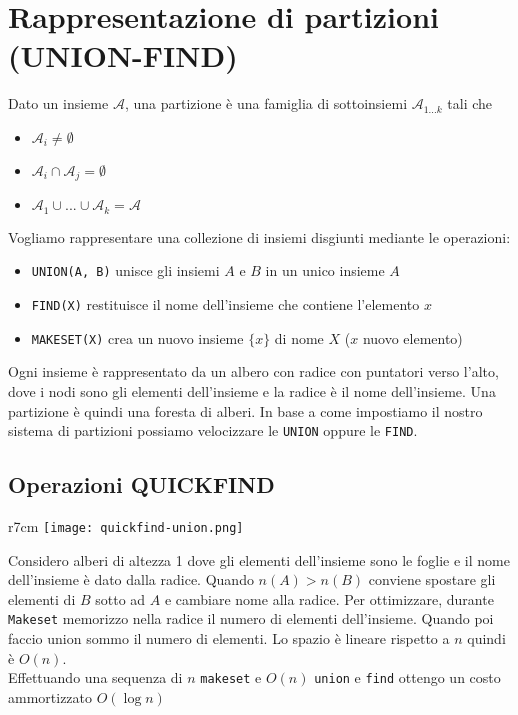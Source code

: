 \section[Union-Find]{Rappresentazione di partizioni (UNION-FIND)}
Dato un insieme $\mathcal{A}$, una partizione è una famiglia di sottoinsiemi $\mathcal{A}_{1...k}$ tali che 
\begin{itemize}
    \item $\mathcal{A}_{i} \neq \emptyset$
    \item  $\mathcal{A}_{i} \cap \mathcal{A}_{j} = \emptyset$
    \item $\mathcal{A}_{1} \cup ... \cup \mathcal{A}_{k} = \mathcal{A}$
\end{itemize}

Vogliamo rappresentare una collezione di insiemi disgiunti mediante le operazioni:
\begin{itemize}
    \item \texttt{UNION(A, B)} unisce gli insiemi $A$ e $B$ in un unico insieme $A$
    \item \texttt{FIND(X)} restituisce il nome dell'insieme che contiene l'elemento $x$
    \item \texttt{MAKESET(X)} crea un nuovo insieme $\lbrace x \rbrace$ di nome $X$ ($x$ nuovo elemento)
\end{itemize}

\noindent Ogni insieme è rappresentato da un albero con radice con puntatori verso l'alto, dove i nodi sono 
gli elementi dell'insieme e la radice è il nome dell'insieme. Una partizione è quindi una foresta di alberi.
In base a come impostiamo il nostro sistema di partizioni possiamo velocizzare le \texttt{UNION} 
oppure le \texttt{FIND}.

\subsection{Operazioni QUICKFIND}
\begin{wrapfigure}{r}{7cm}
    \texttt{[image: quickfind-union.png]}
\end{wrapfigure}
Considero alberi di altezza 1 dove gli elementi dell'insieme sono le foglie
e il nome dell'insieme è dato dalla radice.
Quando $n(A) > n(B)$ conviene spostare gli elementi di $B$ sotto ad $A$ e cambiare
nome alla radice. Per ottimizzare, durante \texttt{Makeset} memorizzo nella radice
il numero di elementi dell'insieme. Quando poi faccio union sommo il numero di elementi.
Lo spazio è lineare rispetto a $n$ quindi è $O(n)$.\\
Effettuando una sequenza di $n$ \texttt{makeset} e $O(n)$ \texttt{union} e \texttt{find}
ottengo un costo ammortizzato $O(\log n)$
\clearpage


